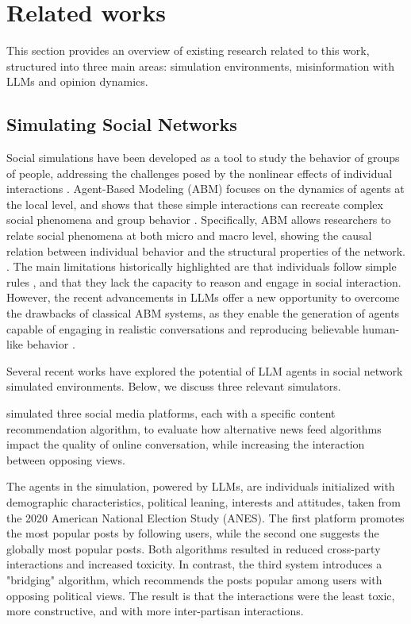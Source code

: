 \section{Related works}
\label{sec:relatedworks}

This section provides an overview of existing research related to this work, structured into three main areas: simulation environments, misinformation with LLMs and opinion dynamics.

\subsection{Simulating Social Networks}

Social simulations have been developed as a tool to study the behavior of groups of people, addressing the challenges posed by the nonlinear effects of individual interactions \cite{squazzoni2014socialsimulation}.
Agent-Based Modeling (ABM) focuses on the dynamics of agents at the local level, and shows that these simple interactions can recreate complex social phenomena and group behavior \cite{macy2002abm}.
Specifically, ABM allows researchers to relate social phenomena at both micro and macro level, showing the causal relation between individual behavior and the structural properties of the network. \cite{squazzoni2014socialsimulation}.
The main limitations historically highlighted are that individuals follow simple rules \cite{conte2014agent}, and that they lack the capacity to reason and engage in social interaction.\cite{törnberg2023evaluate}
However, the recent advancements in LLMs offer a new opportunity to overcome the drawbacks of classical ABM systems, as they enable the generation of agents capable of engaging in realistic conversations and reproducing believable human-like behavior \cite{park2023genagents}.

Several recent works have explored the potential of LLM agents in social network simulated environments. Below, we discuss three relevant simulators.
\medskip

\citet{törnberg2023evaluate} simulated three social media platforms, each with a specific content recommendation algorithm, to evaluate how alternative news feed algorithms impact the quality of online conversation, while increasing the interaction between opposing views.

The agents in the simulation, powered by LLMs, are individuals initialized with demographic characteristics, political leaning, interests and attitudes, taken from the 2020 American National Election Study (ANES).
The first platform promotes the most popular posts by following users, while the second one suggests the globally most popular posts. Both algorithms resulted in reduced cross-party interactions and increased toxicity.
In contrast, the third system introduces a "bridging" algorithm, which recommends the posts popular among users with opposing political views. The result is that the interactions were the least toxic, more constructive, and with more inter-partisan interactions.

